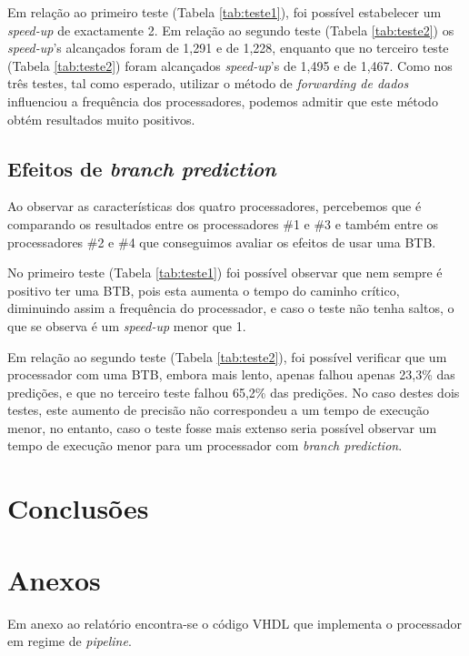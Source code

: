 \documentclass[11pt]{article}
\numberwithin{equation}{section}
\begin{document}
Em relação ao primeiro teste (Tabela \ref{tab:teste1}), foi possível estabelecer um \textit{speed-up} de exactamente 2. Em relação ao segundo teste (Tabela \ref{tab:teste2}) os \textit{speed-up}'s alcançados foram de 1,291 e de 1,228, enquanto que no terceiro teste (Tabela \ref{tab:teste2}) foram alcançados \textit{speed-up}'s de 1,495 e de 1,467. Como nos três testes, tal como esperado, utilizar o método de \textit{forwarding de dados} influenciou a frequência dos processadores, podemos admitir que este método obtém resultados muito positivos.

\subsection{Efeitos de \textit{branch prediction}}

Ao observar as características dos quatro processadores, percebemos que é comparando os resultados entre os processadores \#1 e \#3 e também entre os processadores \#2 e \#4 que conseguimos avaliar os efeitos de usar uma BTB.

No primeiro teste (Tabela \ref{tab:teste1}) foi possível observar que nem sempre é positivo ter uma BTB, pois esta aumenta o tempo do caminho crítico, diminuindo assim a frequência do processador, e caso o teste não tenha saltos, o que se observa é um \textit{speed-up} menor que 1.

Em relação ao segundo teste (Tabela \ref{tab:teste2}), foi possível verificar que um processador com uma BTB, embora mais lento, apenas falhou apenas 23,3\% das predições, e que no terceiro teste falhou 65,2\% das predições. No caso destes dois testes, este aumento de precisão não correspondeu a um tempo de execução menor, no entanto, caso o teste fosse mais extenso seria possível observar um tempo de execução menor para um processador com \textit{branch prediction}.

\section{Conclusões}

\pagebreak

\section{Anexos}

Em anexo ao relatório encontra-se o código VHDL que implementa o processador em regime de \textit{pipeline}.

\pagebreak

\listoftodos
\end{document}
